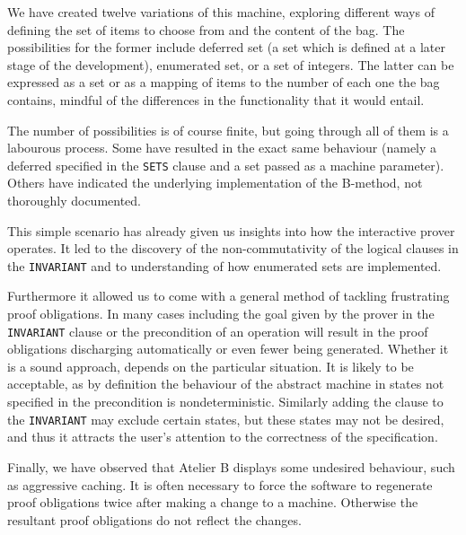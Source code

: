 \documentclass[11pt,journal]{IEEEtran}
\begin{document}
	We have created twelve variations of this machine, exploring different ways of defining the set of items to choose from and the content of the bag. The possibilities for the former include deferred set (a set which is defined at a later stage of the development), enumerated set, or a set of integers. The latter can be expressed as a set or as a mapping of items to the number of each one the bag contains, mindful of the differences in the functionality that it would entail. 
	
	The number of possibilities is of course finite, but going through all of them is a labourous process. Some have resulted in the exact same behaviour (namely a deferred specified in the \texttt{SETS} clause and a set passed as a machine parameter). Others have indicated the underlying implementation of the B-method, not thoroughly documented. 
	
	This simple scenario has already given us insights into how the interactive prover operates. It led to the discovery of the non-commutativity of the logical clauses in the \texttt{INVARIANT} and to understanding of how enumerated sets are implemented. 
	
	Furthermore it allowed us to come with a general method of tackling frustrating proof obligations. In many cases including the goal given by the prover in the \texttt{INVARIANT} clause or the precondition of an operation will result in the proof obligations discharging automatically or even fewer being generated. Whether it is a sound approach, depends on the particular situation. It is likely to be acceptable, as by definition the behaviour of the abstract machine in states not specified in the precondition is nondeterministic. Similarly adding the clause to the \texttt{INVARIANT} may exclude certain states, but these states may not be desired, and thus it attracts the user's attention to the correctness of the specification.
	
	Finally, we have observed that Atelier B displays some undesired behaviour, such as aggressive caching. It is often necessary to force the software to regenerate proof obligations twice after making a change to a machine. Otherwise the resultant proof obligations do not reflect the changes.
	
	
\end{document}
